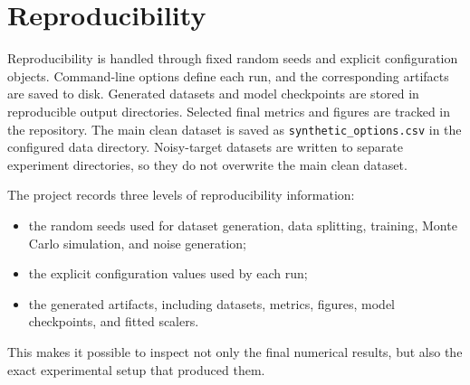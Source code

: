 \section{Reproducibility}

Reproducibility is handled through fixed random seeds and explicit configuration objects.
Command-line options define each run, and the corresponding artifacts are saved to disk.
Generated datasets and model checkpoints are stored in reproducible output directories.
Selected final metrics and figures are tracked in the repository.
The main clean dataset is saved as \texttt{synthetic\_options.csv} in the configured data directory.
Noisy-target datasets are written to separate experiment directories, so they do not overwrite the main clean dataset.

The project records three levels of reproducibility information:

\begin{itemize}
    \item the random seeds used for dataset generation, data splitting, training, Monte Carlo simulation, and noise generation;
    \item the explicit configuration values used by each run;
    \item the generated artifacts, including datasets, metrics, figures, model checkpoints, and fitted scalers.
\end{itemize}
This makes it possible to inspect not only the final numerical results, but also the exact experimental setup that produced them.
